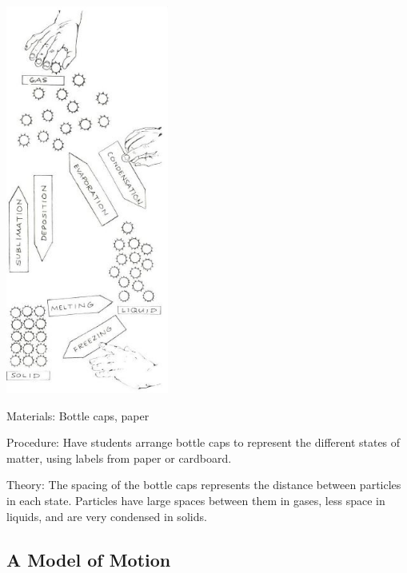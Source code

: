 \begin{multicols}{2}
\begin{center}
\includegraphics[width=0.4\textwidth]{./img/source/state-arranging.jpg}
\end{center}

\begin{description*}
\item[Materials:]{Bottle caps, paper}
\item[Procedure:]{Have students arrange bottle caps to represent the different states of matter, using labels from paper or cardboard.}
\item[Theory:]{The spacing of the bottle caps represents the distance between particles in each state. Particles have large spaces between them in gases, less space in liquids, and are very condensed in solids.}
\end{description*}

\columnbreak

\subsection{A Model of Motion}


\end{multicols}
